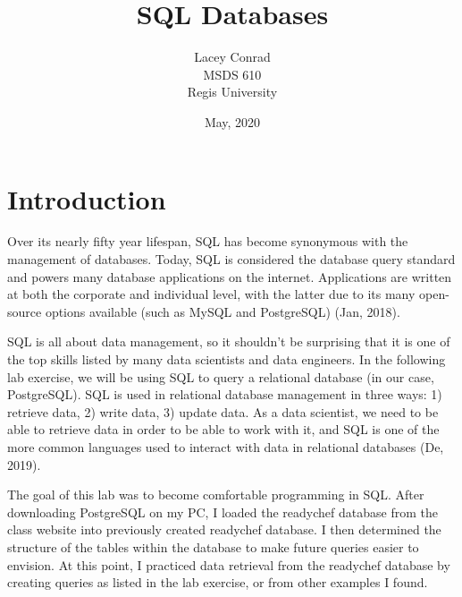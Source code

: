 \documentclass[]{article}
\title{SQL Databases}
\author{Lacey Conrad\\MSDS 610\\ Regis University}
\date{May, 2020}
\begin{document}
	\maketitle
	
\section{Introduction}
Over its nearly fifty year lifespan, SQL has  become synonymous with the management of databases.  Today, SQL is considered the database query standard and powers many database applications on the internet.  Applications are written at both the corporate and individual level, with the latter due to its many open-source options available (such as MySQL and PostgreSQL) (Jan, 2018).

SQL is all about data management, so it shouldn't be surprising that it is one of the top skills listed by many data scientists and data engineers.  In the following lab exercise, we will be using SQL to query a relational database (in our case, PostgreSQL).  SQL is used in relational database management in three ways: 1) retrieve data, 2) write data, 3) update data.  As a data scientist, we need to be able to retrieve data in order to be able to work with it, and SQL is one of the more common languages used to interact with data in relational databases (De, 2019).

The goal of this lab was to become comfortable programming in SQL.  After downloading PostgreSQL on my PC, I loaded the readychef database from the class website into previously created readychef database.  I then determined the structure of the tables within the database to make future queries easier to envision.  At this point, I practiced data retrieval from the readychef database by creating queries as listed in the lab exercise, or from other examples I found.
\end{document}
